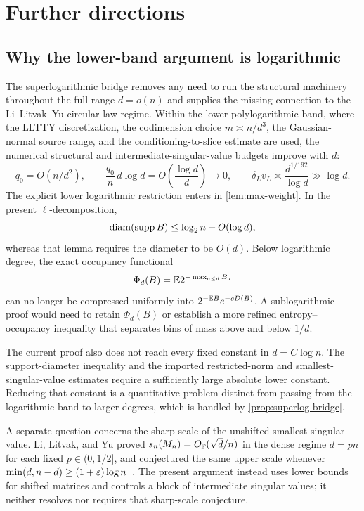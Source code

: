 \section{Further directions}\label{sec:further-directions}

\subsection{Why the lower-band argument is logarithmic}

The superlogarithmic bridge removes any need to run the structural machinery throughout the full range $d=o(n)$ and supplies the missing connection to the Li--Litvak--Yu circular-law regime. Within the lower polylogarithmic band, where the LLTTY discretization, the codimension choice $m\asymp n/d^3$, the Gaussian-normal source range, and the conditioning-to-slice estimate are used, the numerical structural and intermediate-singular-value budgets improve with $d$:
\[
  q_0=O(n/d^2),
  \qquad
  \frac{q_0}{n}\,d\log d=O\!\left(\frac{\log d}{d}\right)\to0,
  \qquad
  \delta_Lv_L\asymp\frac{d^{1/192}}{\log d}\gg\log d.
\]
The explicit lower logarithmic restriction enters in \cref{lem:max-weight}. In the present $\ell$-decomposition,
\[
  \operatorname{diam}(\operatorname{supp} B)\le\log_2n+O(\log d),
\]
whereas that lemma requires the diameter to be $O(d)$. Below logarithmic degree, the exact occupancy functional
\[
  \Phi_d(B)=\mathbb E 2^{-\max_{a\le d}B_a}
\]
can no longer be compressed uniformly into
$2^{-\mathbb E B}e^{-cD(B)}$. A sublogarithmic proof would need to retain $\Phi_d(B)$ or establish a more refined entropy--occupancy inequality that separates bins of mass above and below $1/d$.

The current proof also does not reach every fixed constant in $d=C\log n$. The support-diameter inequality and the imported restricted-norm and smallest-singular-value estimates require a sufficiently large absolute lower constant. Reducing that constant is a quantitative problem distinct from passing from the logarithmic band to larger degrees, which is handled by \cref{prop:superlog-bridge}.

A separate question concerns the sharp scale of the unshifted smallest singular value. Li, Litvak, and Yu proved
$s_n(M_n)=O_{\mathbb P}(\sqrt d/n)$ in the dense regime $d=pn$ for each fixed $p\in(0,1/2]$, and conjectured the same upper scale whenever
$\min(d,n-d)\ge(1+\varepsilon)\log n$~\cite[Theorem~1.1, Remark~1.4, and Conjecture~1.5]{LLY26b}. The present argument instead uses lower bounds for shifted matrices and controls a block of intermediate singular values; it neither resolves nor requires that sharp-scale conjecture.

